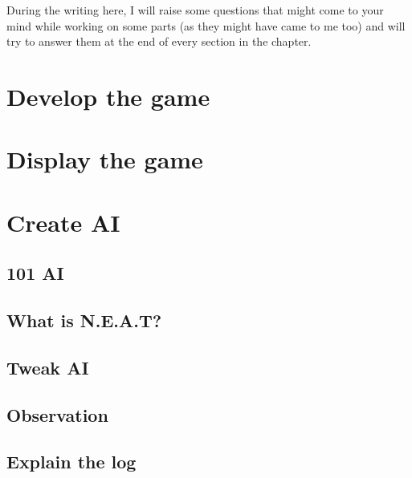 During the writing here, I will raise some questions that might come to your mind while working on some parts (as they might have came to me too) and will try to answer them at the end of every section in the chapter.

\section{Develop the game}\label{develop-the-game}


\section{Display the game}\label{display-the-game}
\section{Create AI}\label{create-ai}

\subsection{101 AI}\label{101-ai}

\subsection{What is N.E.A.T?}\label{what-is-neat}
 
\subsection{Tweak AI}\label{tweak-ai}

\subsection{Observation}\label{Observation}

\subsection{Explain the log}\label{explain-the-log]}
 
 
 
 
 
 
 
 
 
 
 
